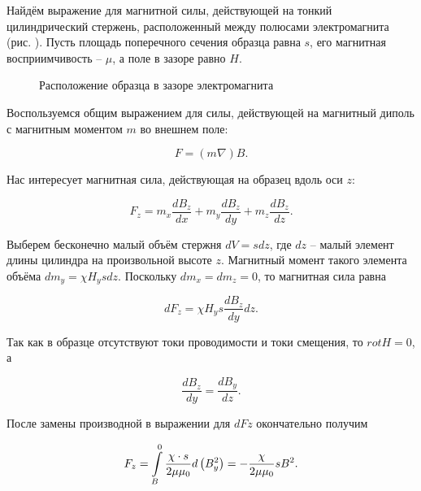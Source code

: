  
Найдём выражение для магнитной силы, действующей на тонкий цилиндрический стержень, расположенный между полюсами электромагнита (рис. ). Пусть площадь поперечного сечения образца равна $s$, его магнитная восприимчивость -- $\mu$, а поле в зазоре равно $H$.


\begin{wrapfigure}{r}{0.4\textwidth}
	\caption{Расположение образца в зазоре электромагнита}
\end{wrapfigure}

Воспользуемся общим выражением для силы, действующей на магнитный диполь с магнитным моментом $m$ во внешнем поле:

\begin{equation*}
	F = (m\nabla)B.
\end{equation*}

Нас интересует магнитная сила, действующая на образец вдоль оси $z$:

\begin{equation*}
	F_z = m_x \frac{dB_z}{dx} + m_y \frac{dB_z}{dy} + m_z \frac{dB_z}{dz}.
\end{equation*}

Выберем бесконечно малый объём стержня $dV = sdz$, где $dz$ -- малый элемент длины цилиндра на произвольной высоте $z$. Магнитный момент такого элемента объёма $dm_y = \chi H_y s dz$. Поскольку $dm_x = dm_z = 0$, то магнитная сила равна

\begin{equation*}
	dF_z = \chi H_y s \frac{dB_z}{dy} dz.
\end{equation*}

Так как в образце отсутствуют токи проводимости и токи смещения, то $rot H = 0$, а

\begin{equation*}
	\frac{dB_z}{dy} = \frac{dB_y}{dz}.
\end{equation*}

После замены производной в выражении для $dFz$ окончательно получим

\begin{equation}
	\eqmark{magnetic force-z}
	F_z = \int\limits_B^0 \frac{\chi\cdot s}{2\mu \mu_0}d\left( B_y^2 \right) = - \frac{\chi}{2\mu \mu_0} sB^2.
\end{equation}

